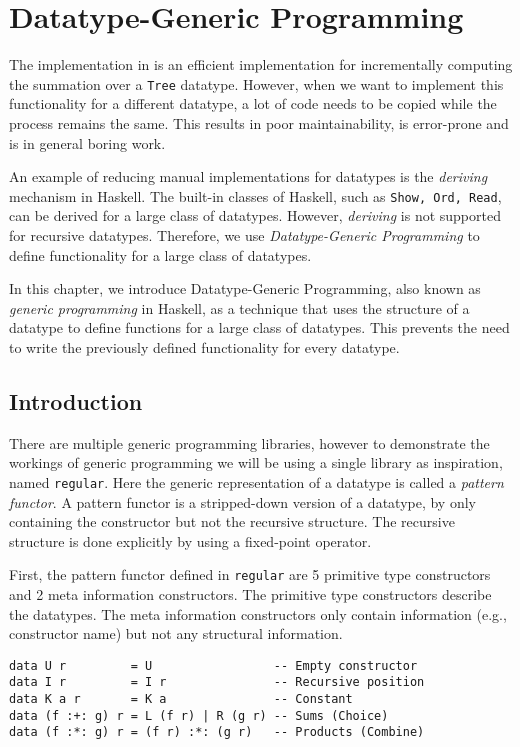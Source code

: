 \chapter{Datatype-Generic Programming}
\label{chap-dat-gen-program}

The implementation in  is an efficient implementation for incrementally computing the summation over a \texttt{Tree} datatype. However, when we want to implement this functionality for a different datatype, a lot of code needs to be copied while the process remains the same. This results in poor maintainability, is error-prone and is in general boring work.

An example of reducing manual implementations for datatypes is the \textit{deriving} mechanism in Haskell. The built-in classes of Haskell, such as \texttt{Show, Ord, Read}, can be derived for a large class of datatypes. However, \textit{deriving} is not supported for recursive datatypes. Therefore, we use \textit{Datatype-Generic Programming}\cite*{gibbons2006datatype} to define functionality for a large class of datatypes.

In this chapter, we introduce Datatype-Generic Programming, also known as \textit{generic programming} in Haskell, as a technique that uses the structure of a datatype to define functions for a large class of datatypes. This prevents the need to write the previously defined functionality for every datatype.

\section{Introduction}
There are multiple generic programming libraries, however to demonstrate the workings of generic programming we will be using a single library as inspiration, named \texttt{regular}\cite*{regular2022}. Here the generic representation of a datatype is called a \textit{pattern functor}. A pattern functor is a stripped-down version of a datatype, by only containing the constructor but not the recursive structure. The recursive structure is done explicitly by using a fixed-point operator. 

First, the pattern functor defined in \texttt{regular} are 5 primitive type constructors and 2 meta information constructors. The primitive type constructors describe the datatypes. The meta information constructors only contain information (e.g., constructor name) but not any structural information.

\pagebreak
\begin{verbatim}
data U r         = U                 -- Empty constructor
data I r         = I r               -- Recursive position
data K a r       = K a               -- Constant
data (f :+: g) r = L (f r) | R (g r) -- Sums (Choice)
data (f :*: g) r = (f r) :*: (g r)   -- Products (Combine)
\end{verbatim}

